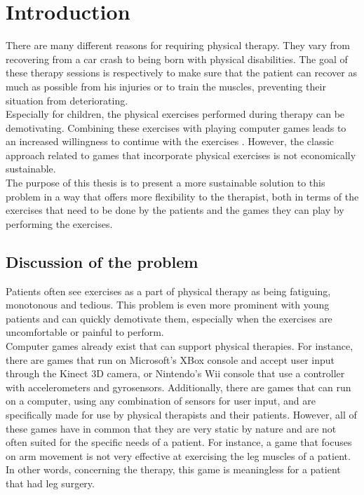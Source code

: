 \chapter{Introduction}

There are many different reasons for requiring physical therapy. They vary from recovering from a car crash to being born with physical disabilities. The goal of these therapy sessions is respectively to make sure that the patient can recover as much as possible from his injuries or to train the muscles, preventing their situation from deteriorating.\\

Especially for children, the physical exercises performed during therapy can be demotivating. Combining these exercises with playing computer games leads to an increased willingness to continue with the exercises \cite{Brauner2013}. However, the classic approach related to games that incorporate physical exercises is not economically sustainable.\\

The purpose of this thesis is to present a more sustainable solution to this problem in a way that offers more flexibility to the therapist, both in terms of the exercises that need to be done by the patients and the games they can play by performing the exercises.


\section{Discussion of the problem}

Patients often see exercises as a part of physical therapy as being fatiguing, monotonous and tedious. This problem is even more prominent with young patients and can quickly demotivate them, especially when the exercises are uncomfortable or painful to perform.\\

Computer games already exist that can support physical therapies. For instance, there are games that run on Microsoft's XBox console and accept user input through the Kinect 3D camera, or Nintendo's Wii console that use a controller with accelerometers and gyrosensors. Additionally, there are games that can run on a computer, using any combination of sensors for user input, and are specifically made for use by physical therapists and their patients. However, all of these games have in common that they are very static by nature and are not often suited for the specific needs of a patient. For instance, a game that focuses on arm movement is not very effective at exercising the leg muscles of a patient. In other words, concerning the therapy, this game is meaningless for a patient that had leg surgery.\\

